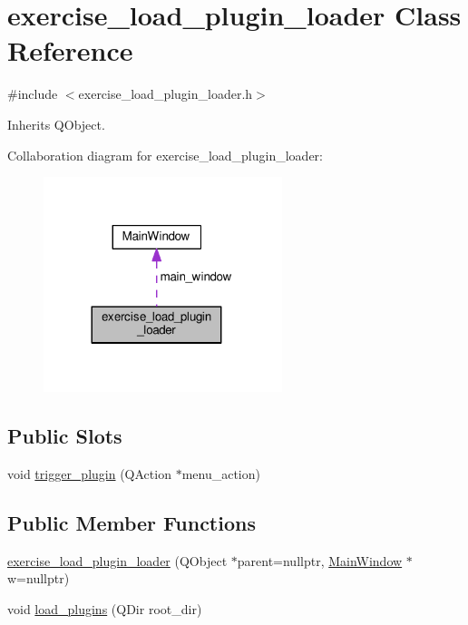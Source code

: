 \hypertarget{classexercise__load__plugin__loader}{}\section{exercise\+\_\+load\+\_\+plugin\+\_\+loader Class Reference}
\label{classexercise__load__plugin__loader}


{\ttfamily \#include $<$exercise\+\_\+load\+\_\+plugin\+\_\+loader.\+h$>$}



Inherits Q\+Object.



Collaboration diagram for exercise\+\_\+load\+\_\+plugin\+\_\+loader\+:\nopagebreak
\begin{figure}[H]
\begin{center}
\leavevmode
\includegraphics[width=197pt]{classexercise__load__plugin__loader__coll__graph}
\end{center}
\end{figure}
\subsection*{Public Slots}
\begin{DoxyCompactItemize}
\item 
void \hyperlink{classexercise__load__plugin__loader_a43ae5461bec5ad5a7afdb25a4ae2b021}{trigger\+\_\+plugin} (Q\+Action $\ast$menu\+\_\+action)
\end{DoxyCompactItemize}
\subsection*{Public Member Functions}
\begin{DoxyCompactItemize}
\item 
\hyperlink{classexercise__load__plugin__loader_a1c0b6c3d02cae87b2ef013267f6c1c95}{exercise\+\_\+load\+\_\+plugin\+\_\+loader} (Q\+Object $\ast$parent=nullptr, \hyperlink{classMainWindow}{Main\+Window} $\ast$w=nullptr)
\item 
void \hyperlink{classexercise__load__plugin__loader_a1a388b6c581a2fb5870f16913181284e}{load\+\_\+plugins} (Q\+Dir root\+\_\+dir)
\end{DoxyCompactItemize}
